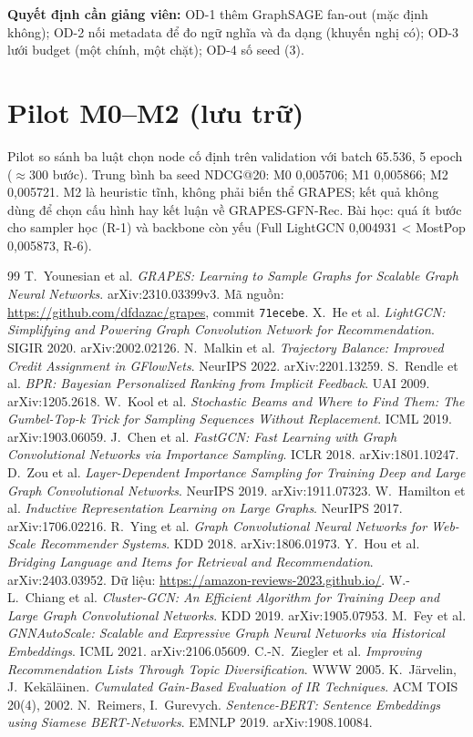 \documentclass[11pt,a4paper,oneside]{report}
\begin{document}
\noindent\textbf{Quyết định cần giảng viên:} OD-1 thêm GraphSAGE fan-out (mặc định không); OD-2 nối metadata để đo ngữ nghĩa và đa dạng (khuyến nghị có); OD-3 lưới budget (một chính, một chặt); OD-4 số seed (3).

\chapter{Pilot M0--M2 (lưu trữ)}
Pilot so sánh ba luật chọn node cố định trên validation với batch 65.536, 5 epoch ($\approx$300 bước). Trung bình ba seed NDCG@20: M0 0,005706; M1 0,005866; M2 0,005721. M2 là heuristic tĩnh, không phải biến thể GRAPES; kết quả không dùng để chọn cấu hình hay kết luận về GRAPES-GFN-Rec. Bài học: quá ít bước cho sampler học (R-1) và backbone còn yếu (Full LightGCN 0,004931 < MostPop 0,005873, R-6).

\begin{thebibliography}{99}\small
{} T.~Younesian et al. \emph{GRAPES: Learning to Sample Graphs for Scalable Graph Neural Networks}. arXiv:2310.03399v3. Mã nguồn: \url{https://github.com/dfdazac/grapes}, commit \texttt{71ecebe}.
 X.~He et al. \emph{LightGCN: Simplifying and Powering Graph Convolution Network for Recommendation}. SIGIR 2020. arXiv:2002.02126.
 N.~Malkin et al. \emph{Trajectory Balance: Improved Credit Assignment in GFlowNets}. NeurIPS 2022. arXiv:2201.13259.
 S.~Rendle et al. \emph{BPR: Bayesian Personalized Ranking from Implicit Feedback}. UAI 2009. arXiv:1205.2618.
 W.~Kool et al. \emph{Stochastic Beams and Where to Find Them: The Gumbel-Top-k Trick for Sampling Sequences Without Replacement}. ICML 2019. arXiv:1903.06059.
 J.~Chen et al. \emph{FastGCN: Fast Learning with Graph Convolutional Networks via Importance Sampling}. ICLR 2018. arXiv:1801.10247.
 D.~Zou et al. \emph{Layer-Dependent Importance Sampling for Training Deep and Large Graph Convolutional Networks}. NeurIPS 2019. arXiv:1911.07323.
 W.~Hamilton et al. \emph{Inductive Representation Learning on Large Graphs}. NeurIPS 2017. arXiv:1706.02216.
 R.~Ying et al. \emph{Graph Convolutional Neural Networks for Web-Scale Recommender Systems}. KDD 2018. arXiv:1806.01973.
 Y.~Hou et al. \emph{Bridging Language and Items for Retrieval and Recommendation}. arXiv:2403.03952. Dữ liệu: \url{https://amazon-reviews-2023.github.io/}.
 W.-L.~Chiang et al. \emph{Cluster-GCN: An Efficient Algorithm for Training Deep and Large Graph Convolutional Networks}. KDD 2019. arXiv:1905.07953.
 M.~Fey et al. \emph{GNNAutoScale: Scalable and Expressive Graph Neural Networks via Historical Embeddings}. ICML 2021. arXiv:2106.05609.
 C.-N.~Ziegler et al. \emph{Improving Recommendation Lists Through Topic Diversification}. WWW 2005.
 K.~Järvelin, J.~Kekäläinen. \emph{Cumulated Gain-Based Evaluation of IR Techniques}. ACM TOIS 20(4), 2002.
 N.~Reimers, I.~Gurevych. \emph{Sentence-BERT: Sentence Embeddings using Siamese BERT-Networks}. EMNLP 2019. arXiv:1908.10084.
\end{thebibliography}
\end{document}
